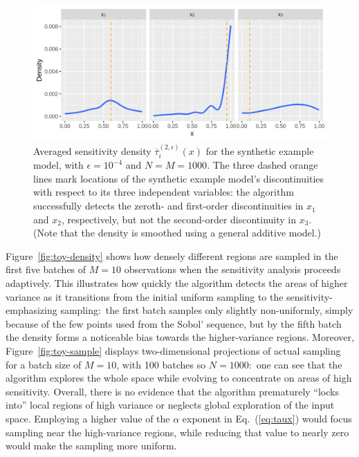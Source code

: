 \documentclass[12pt]{article}
\begin{document}
\begin{figure}
    \centering
    \includegraphics[width=1.00\linewidth]{figures/toy-taubar.png}
    \caption{Averaged sensitivity density $\overline{\tau}_i^{(2,\epsilon)}(x)$ for the synthetic example model, with $\epsilon = 10^{-4}$ and $N = M = 1000$. The three dashed orange lines mark locations of the synthetic example model's discontinuities with respect to its three independent variables: the algorithm successfully detects the zeroth- and first-order discontinuities in $x_1$ and $x_2$, respectively, but not the second-order discontinuity in $x_3$. (Note that the density is smoothed using a general additive model.)}
    \label{fig:toy-taubar}
\end{figure}

Figure~\ref{fig:toy-density} shows how densely different regions are sampled in the first five batches of $M = 10$ observations when the sensitivity analysis proceeds adaptively. This illustrates how quickly the algorithm detects the areas of higher variance as it transitions from the initial uniform sampling to the sensitivity-emphasizing sampling:\ the first batch samples only slightly non-uniformly, simply because of the few points used from the Sobol' sequence, but by the fifth batch the density forms a noticeable bias towards the higher-variance regions. Moreover, Figure~\ref{fig:toy-sample} displays two-dimensional projections of actual sampling for a batch size of $M = 10$, with 100 batches so $N = 1000$:\ one can see that the algorithm explores the whole space while evolving to concentrate on areas of high sensitivity. Overall, there is no evidence that the algorithm prematurely ``locks into'' local regions of high variance or neglects global exploration of the input space. Employing a higher value of the $\alpha$ exponent in Eq.~(\ref{eq:taux}) would focus sampling near the high-variance regions, while reducing that value to nearly zero would make the sampling more uniform.
\end{document}
